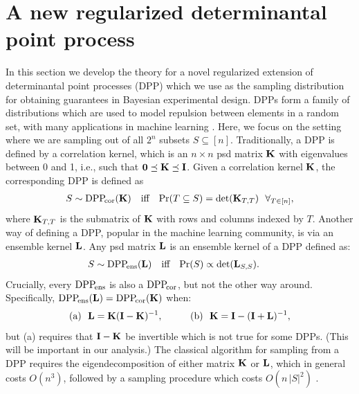 \documentclass[../../thesis.tex]{subfiles}
\begin{document}
\section{A new regularized determinantal point process}
\label{s:r-dpp}
In this section we develop the theory for a novel regularized extension of
determinantal point processes (DPP) which we use as the sampling distribution
for obtaining guarantees in Bayesian experimental design.
DPPs form a family of distributions which are used to model repulsion between
elements in a random set, with many applications in machine learning
\citep{dpp-ml}. Here, we focus on the setting where we are sampling out of all
$2^n$ subsets $S\subseteq[n]$. Traditionally, a DPP is defined by a
correlation kernel, which is an $n\times n$ psd matrix $\mathbf K$ with eigenvalues
between 0 and 1, i.e., such that $\mathbf 0\preceq\mathbf K\preceq \mathbf I$. Given a
correlation kernel $\mathbf K$, the corresponding DPP is
defined as
\begin{align*}
  S\sim{{\mathrm{DPP}}_{\!\mathrm{cor}}}(\mathbf K)\quad\text{iff}\quad
  \mathrm{Pr}(T\subseteq S) = \det(\mathbf K_{T,T})\ \  \forall_{T\in[n]},
\end{align*}
where $\mathbf K_{T,T}$ is the submatrix of $\mathbf K$ with rows and columns
indexed by $T$. Another way of defining a DPP, popular in the machine
learning community, is via an ensemble kernel $\mathbf{L}$. Any psd matrix
$\mathbf{L}$ is an ensemble kernel of a DPP defined as:
\begin{align*}
  S\sim{{\mathrm{DPP}}_{\!\mathrm{ens}}}(\mathbf{L})\quad\text{iff}\quad \mathrm{Pr}(S) \propto \det(\mathbf{L}_{S,S}).\quad~
\end{align*}
Crucially, every ${{\mathrm{DPP}}_{\!\mathrm{ens}}}$ is also a ${{\mathrm{DPP}}_{\!\mathrm{cor}}}$, but not the other way
around. Specifically, ${{\mathrm{DPP}}_{\!\mathrm{ens}}}(\mathbf{L})={{\mathrm{DPP}}_{\!\mathrm{cor}}}(\mathbf K)$ when:
\begin{align*}
   & \text{(a)}\ \  \mathbf{L}=\mathbf K(\mathbf I-\mathbf K)^{-1},\qquad
   & \text{(b)}\ \  \mathbf K = \mathbf I -  (\mathbf I+\mathbf{L})^{-1},
\end{align*}
but (a) requires that $\mathbf I-\mathbf K$ be invertible which is not true
for some DPPs.
(This will be important in our analysis.)
The classical algorithm for sampling from a DPP requires the
eigendecomposition of either matrix $\mathbf K$ or $\mathbf{L}$, which in general
costs $O(n^3)$, followed by a sampling procedure which costs
$O(n\,|S|^2)$ \cite{dpp-independence,dpp-ml}.
\end{document}

